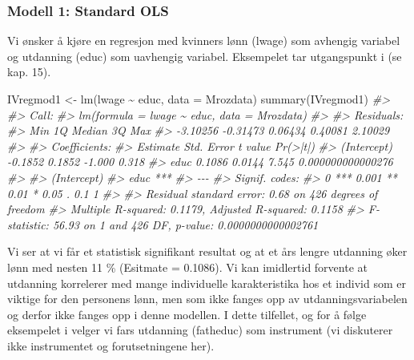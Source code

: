 \documentclass[
]{article}
\newenvironment{Shaded}{\begin{snugshade}}{\end{snugshade}}
\newcommand{\AttributeTok}[1]{\textcolor[rgb]{0.77,0.63,0.00}{#1}}
\newcommand{\CommentTok}[1]{\textcolor[rgb]{0.56,0.35,0.01}{\textit{#1}}}
\newcommand{\FunctionTok}[1]{\textcolor[rgb]{0.00,0.00,0.00}{#1}}
\newcommand{\NormalTok}[1]{#1}
\newcommand{\OtherTok}[1]{\textcolor[rgb]{0.56,0.35,0.01}{#1}}
\newcommand{\SpecialCharTok}[1]{\textcolor[rgb]{0.00,0.00,0.00}{#1}}
\begin{document}
\hypertarget{modell-1-standard-ols}{%
\subsubsection{Modell 1: Standard OLS}\label{modell-1-standard-ols}}

Vi ønsker å kjøre en regresjon med kvinners lønn (lwage) som avhengig variabel og utdanning (educ) som uavhengig variabel. Eksempelet tar utgangspunkt i \citet{wooldridgeIntroductoryEconometricsModern2016} (se kap. 15).

\begin{Shaded}
\begin{Highlighting}[]
\NormalTok{IVregmod1 }\OtherTok{\textless{}{-}} \FunctionTok{lm}\NormalTok{(lwage }\SpecialCharTok{\textasciitilde{}}\NormalTok{ educ, }\AttributeTok{data =}\NormalTok{ Mrozdata)}
\FunctionTok{summary}\NormalTok{(IVregmod1)}
\CommentTok{\#\textgreater{} }
\CommentTok{\#\textgreater{} Call:}
\CommentTok{\#\textgreater{} lm(formula = lwage \textasciitilde{} educ, data = Mrozdata)}
\CommentTok{\#\textgreater{} }
\CommentTok{\#\textgreater{} Residuals:}
\CommentTok{\#\textgreater{}      Min       1Q   Median       3Q      Max }
\CommentTok{\#\textgreater{} {-}3.10256 {-}0.31473  0.06434  0.40081  2.10029 }
\CommentTok{\#\textgreater{} }
\CommentTok{\#\textgreater{} Coefficients:}
\CommentTok{\#\textgreater{}             Estimate Std. Error t value          Pr(\textgreater{}|t|)}
\CommentTok{\#\textgreater{} (Intercept)  {-}0.1852     0.1852  {-}1.000             0.318}
\CommentTok{\#\textgreater{} educ          0.1086     0.0144   7.545 0.000000000000276}
\CommentTok{\#\textgreater{}                }
\CommentTok{\#\textgreater{} (Intercept)    }
\CommentTok{\#\textgreater{} educ        ***}
\CommentTok{\#\textgreater{} {-}{-}{-}}
\CommentTok{\#\textgreater{} Signif. codes:  }
\CommentTok{\#\textgreater{} 0 \textquotesingle{}***\textquotesingle{} 0.001 \textquotesingle{}**\textquotesingle{} 0.01 \textquotesingle{}*\textquotesingle{} 0.05 \textquotesingle{}.\textquotesingle{} 0.1 \textquotesingle{} \textquotesingle{} 1}
\CommentTok{\#\textgreater{} }
\CommentTok{\#\textgreater{} Residual standard error: 0.68 on 426 degrees of freedom}
\CommentTok{\#\textgreater{} Multiple R{-}squared:  0.1179, Adjusted R{-}squared:  0.1158 }
\CommentTok{\#\textgreater{} F{-}statistic: 56.93 on 1 and 426 DF,  p{-}value: 0.0000000000002761}
\end{Highlighting}
\end{Shaded}

Vi ser at vi får et statistisk signifikant resultat og at et års lengre utdanning øker lønn med nesten 11 \% (Esitmate = 0.1086). Vi kan imidlertid forvente at utdanning korrelerer med mange individuelle karakteristika hos et individ som er viktige for den personens lønn, men som ikke fanges opp av utdanningsvariabelen og derfor ikke fanges opp i denne modellen. I dette tilfellet, og for å følge eksempelet i \citet{wooldridgeIntroductoryEconometricsModern2016} velger vi fars utdanning (fatheduc) som instrument (vi diskuterer ikke instrumentet og forutsetningene her).
\end{document}
